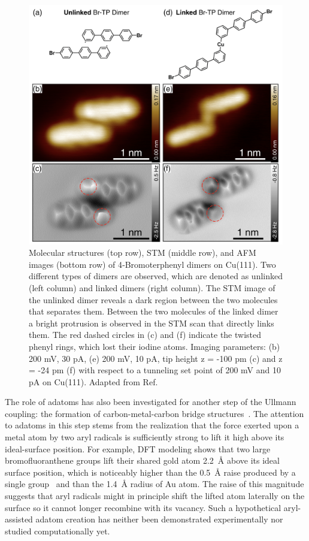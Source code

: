 \documentclass[aps,prb,amsmath,amssymb,11pt]{revtex4-1}
\begin{document}
\begin{figure}[tb]
\centering
\includegraphics[width=0.75\columnwidth]{Fig/AFM_prove.png}
\caption{Molecular structures (top row), STM (middle row), and AFM images (bottom row) of 4‐Bromoterphenyl dimers on Cu(111). Two different types of dimers are observed, which are denoted as unlinked (left column) and linked dimers (right column). The STM image of the unlinked dimer reveals a dark region between the two molecules that separates them. Between the two molecules of the linked dimer a bright protrusion is observed in the STM scan that directly links them. The red dashed circles in (c) and (f) indicate the twisted phenyl rings, which lost their iodine atoms. Imaging parameters: (b) 200 mV, 30 pA, (e) 200 mV, 10 pA, tip height z = -100 pm (c) and z = -24 pm (f) with respect to a tunneling set point of 200 mV and 10 pA on Cu(111). Adapted from Ref.~\cite{acsnano2019}}
\label{fig:adatom-CMC-evidence2}
\end{figure}

\fi

The role of adatoms has also been investigated for another step of the Ullmann coupling: the formation of carbon-metal-carbon bridge structures~\cite{acsnano2017, acsnano2019}. 
The attention to adatoms in this step stems from the realization that the force exerted upon a metal atom by two aryl radicals is sufficiently strong to lift it high above its ideal-surface position. 
For example, DFT modeling shows that two large bromofluoranthene groups lift their shared gold atom \SI{2.2}{\angstrom} above its ideal surface position, which is noticeably higher than the \SI{0.5}{\angstrom} raise produced by a single group~\cite{jpcc2018} and than the \SI{1.4}{\angstrom} radius of Au atom.
The raise of this magnitude suggests that aryl radicals might in principle shift the lifted atom laterally on the surface so it cannot longer recombine with its vacancy. Such a hypothetical aryl-assisted adatom creation has neither been demonstrated experimentally nor studied computationally yet.
\end{document}
